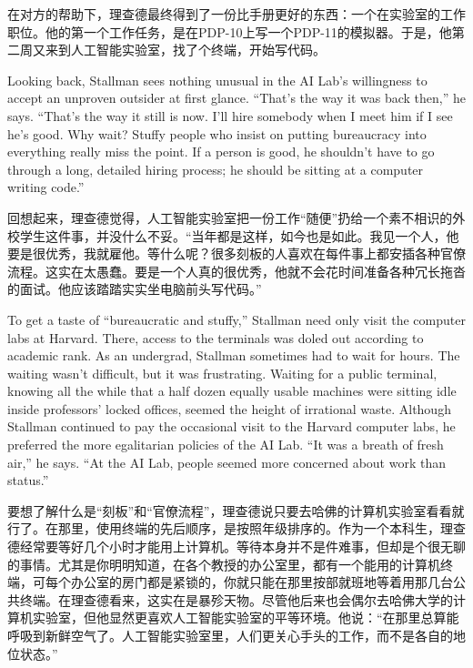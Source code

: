 \ifdefined\chs
在对方的帮助下，理查德最终得到了一份比手册更好的东西：一个在实验室的工作职位。他的第一个工作任务，是在PDP-10上写一个PDP-11的模拟器。于是，他第二周又来到人工智能实验室，找了个终端，开始写代码。
\fi

\ifdefined\eng
Looking back, Stallman sees nothing unusual in the AI Lab's willingness to accept an unproven outsider at first glance. ``That's the way it was back then,'' he says. ``That's the way it still is now. I'll hire somebody when I meet him if I see he's good. Why wait? Stuffy people who insist on putting bureaucracy into everything really miss the point. If a person is good, he shouldn't have to go through a long, detailed hiring process; he should be sitting at a computer writing code.''
\fi

\ifdefined\chs
回想起来，理查德觉得，人工智能实验室把一份工作``随便''扔给一个素不相识的外校学生这件事，并没什么不妥。``当年都是这样，如今也是如此。我见一个人，他要是很优秀，我就雇他。等什么呢？很多刻板的人喜欢在每件事上都安插各种官僚流程。这实在太愚蠢。要是一个人真的很优秀，他就不会花时间准备各种冗长拖沓的面试。他应该踏踏实实坐电脑前头写代码。''
\fi

\ifdefined\eng
To get a taste of ``bureaucratic and stuffy,'' Stallman need only visit the computer labs at Harvard. There, access to the terminals was doled out according to academic rank. As an undergrad, Stallman sometimes had to wait for hours. The waiting wasn't difficult, but it was frustrating. Waiting for a public terminal, knowing all the while that a half dozen equally usable machines were sitting idle inside professors' locked offices, seemed the height of irrational waste. Although Stallman continued to pay the occasional visit to the Harvard computer labs, he preferred the more egalitarian policies of the AI Lab. ``It was a breath of fresh air,'' he says. ``At the AI Lab, people seemed more concerned about work than status.''
\fi

\ifdefined\chs
要想了解什么是``刻板''和``官僚流程''，理查德说只要去哈佛的计算机实验室看看就行了。在那里，使用终端的先后顺序，是按照年级排序的。作为一个本科生，理查德经常要等好几个小时才能用上计算机。等待本身并不是件难事，但却是个很无聊的事情。尤其是你明明知道，在各个教授的办公室里，都有一个能用的计算机终端，可每个办公室的房门都是紧锁的，你就只能在那里按部就班地等着用那几台公共终端。在理查德看来，这实在是暴殄天物。尽管他后来也会偶尔去哈佛大学的计算机实验室，但他显然更喜欢人工智能实验室的平等环境。他说：``在那里总算能呼吸到新鲜空气了。人工智能实验室里，人们更关心手头的工作，而不是各自的地位状态。''
\fi

